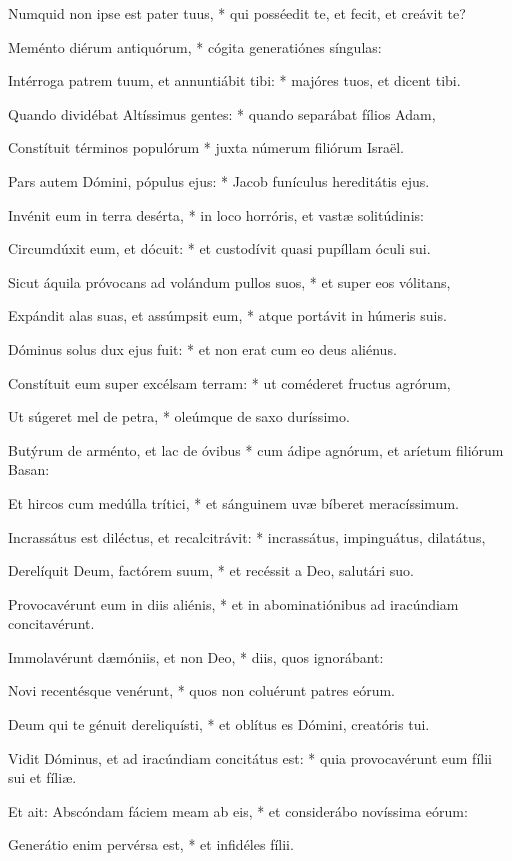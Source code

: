 Numquid non ipse est pater tuus, * qui posséedit te, et fecit, et creávit te?

Meménto diérum antiquórum, * cógita generatiónes síngulas:

Intérroga patrem tuum, et annuntiábit tibi: * majóres tuos, et dicent tibi.

Quando dividébat Altíssimus gentes: * quando separábat fílios Adam,

Constítuit términos populórum * juxta númerum filiórum Israël.

Pars autem Dómini, pópulus ejus: * Jacob funículus hereditátis ejus.

Invénit eum in terra desérta, * in loco horróris, et vastæ solitúdinis:

Circumdúxit eum, et dócuit: * et custodívit quasi pupíllam óculi sui.

Sicut áquila próvocans ad volándum pullos suos, * et super eos vólitans,

Expándit alas suas, et assúmpsit eum, * atque portávit in húmeris suis.

Dóminus solus dux ejus fuit: * et non erat cum eo deus aliénus.

Constítuit eum super excélsam terram: * ut coméderet fructus agrórum,

Ut súgeret mel de petra, * oleúmque de saxo duríssimo.

Butýrum de arménto, et lac de óvibus * cum ádipe agnórum, et aríetum filiórum Basan:

Et hircos cum medúlla trítici, * et sánguinem uvæ bíberet meracíssimum.

Incrassátus est diléctus, et recalcitrávit: * incrassátus, impinguátus, dilatátus,

Derelíquit Deum, factórem suum, * et recéssit a Deo, salutári suo.

Provocavérunt eum in diis aliénis, * et in abominatiónibus ad iracúndiam concitavérunt.

Immolavérunt dæmóniis, et non Deo, * diis, quos ignorábant:

Novi recentésque venérunt, * quos non coluérunt patres eórum.

Deum qui te génuit dereliquísti, * et oblítus es Dómini, creatóris tui.

Vidit Dóminus, et ad iracúndiam concitátus est: * quia provocavérunt eum fílii sui et fíliæ.

Et ait: Abscóndam fáciem meam ab eis, * et considerábo novíssima eórum:

Generátio enim pervérsa est, * et infidéles fílii.

